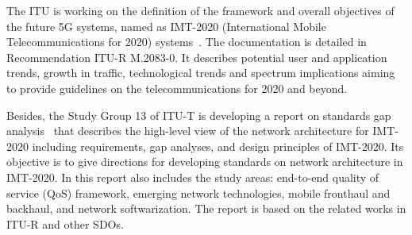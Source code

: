 The ITU is working on the definition of the framework and overall objectives of the future 5G systems, named as IMT-2020 (International Mobile Telecommunications for 2020) systems~\cite{ITU-R2015RecommendationBeyond}. The documentation is detailed in Recommendation ITU-R M.2083-0. It describes potential user and application trends, growth in traffic, technological trends and spectrum implications aiming to provide guidelines on the telecommunications for 2020 and beyond.

Besides, the Study Group 13 of ITU-T is developing a report on standards gap analysis~\cite{ITU-T2015FGAnalysis} that describes the high-level view of the network architecture for IMT-2020 including requirements, gap analyses, and design principles of IMT-2020. Its objective is to give directions for developing standards on network architecture in IMT-2020. In this report also includes the study areas:  end-to-end quality of service (QoS) framework, emerging network technologies, mobile fronthaul and backhaul, and network softwarization. The report is based on the related works in ITU-R and other SDOs.
